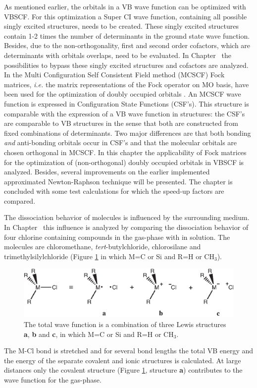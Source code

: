 As mentioned earlier, the orbitals in a VB wave function can be optimized with VBSCF. For this optimization a Super CI wave function, containing all possible singly excited structures,  needs to be created. These singly excited structures contain 1-2 times the number of determinants in the ground state wave function. Besides, due to the non-orthogonality, first and second order cofactors, which are determinants with orbitals overlaps, need to be evaluated. In Chapter \chorbopt\ the possibilities to bypass these singly excited structures and cofactors are analyzed. In the Multi Configuration Self Consistent Field method (MCSCF) \cite{wahldasbook,daswahl} Fock matrices, \textit{i.e.} the matrix representations of the Fock operator on MO basis, have been used for the optimization of doubly occupied orbitals \cite{roos1,roos2}. An MCSCF wave function is expressed in Configuration State Functions (CSF's). This structure is comparable with the expression of a VB wave function in structures: the CSF's are comparable to VB structures in the sense that both are constructed from fixed combinations of determinants. Two major differences are that both bonding \textit{and} anti-bonding orbitals occur in CSF's and that the molecular orbitals are chosen orthogonal in MCSCF. In this chapter the applicability of Fock matrices for the optimization of (non-orthogonal) doubly occupied orbitals in VBSCF is analyzed. Besides, several improvements on the earlier implemented approximated Newton-Raphson technique \cite{koos1} will be presented. The chapter is concluded with some test calculations for which the speed-up factors are compared.

The dissociation behavior of molecules is influenced by the surrounding medium. In Chapter \chdissociation\ this influence is analyzed by comparing the dissociation behavior of four chlorine containing compounds in the gas-phase with in solution. The molecules are chloromethane, \textit{tert}-butylchloride, chlorosilane and trimethylsilylchloride (Figure \ref{ch1.fig.structures1} in which M=C or Si and R=H or CH$_3$).
\begin{figure}[htbp]
\center
\includegraphics{introduction/figures/structures.eps}
\caption{The total wave function is a combination of three Lewis structures \textbf{a}, \textbf{b} and \textbf{c}, in which M=C or Si and R=H or CH$_3$.}
\label{ch1.fig.structures1}
\end{figure}
The M-Cl bond  is stretched and for several bond lengths the total VB energy and the energy of the separate covalent and ionic structures is calculated. At large distances only the covalent structure (Figure \ref{ch1.fig.structures1}, structure \textbf{a}) contributes to the wave function for the gas-phase. 


